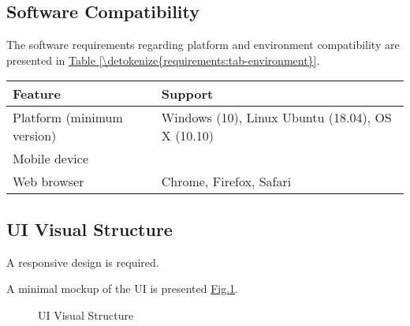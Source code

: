 \documentclass[letterpaper,10pt, openany,english]{sphinxmanual}
\begin{document}
\subsection{Software Compatibility}
\label{\detokenize{requirements:software-compatibility}}
The software requirements regarding platform and environment compatibility are presented in \hyperref[\detokenize{requirements:tab-environment}]{Table \ref{\detokenize{requirements:tab-environment}}}.


\begin{savenotes}\sphinxattablestart
\centering
{}
\sphinxthecaptionisattop
{}\label{\detokenize{requirements:id22}}\label{\detokenize{requirements:tab-environment}}
\sphinxaftertopcaption
\begin{tabulary}{\linewidth}[t]{|T|T|}
\hline
\sphinxstyletheadfamily 
Feature
&\sphinxstyletheadfamily 
Support
\\
\hline
Platform (minimum version)
&
Windows (10), Linux Ubuntu (18.04), OS X (10.10)
\\
\hline
Mobile device
&
\\
\hline
Web browser
&
Chrome, Firefox, Safari
\\
\hline
\end{tabulary}
\par
\sphinxattableend\end{savenotes}


\subsection{UI Visual Structure}
\label{\detokenize{requirements:ui-visual-structure}}
A responsive design is required.

A minimal mockup of the UI is presented \hyperref[\detokenize{requirements:screen-mockup}]{Fig.\@ \ref{\detokenize{requirements:screen-mockup}}}.

\begin{figure}[htbp]
\centering
\capstart

\noindent{}
\caption{UI Visual Structure}\label{\detokenize{requirements:screen-mockup}}\end{figure}
\end{document}
